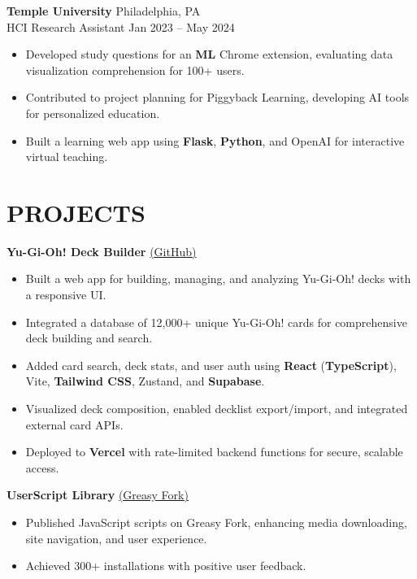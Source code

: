 \documentclass[10pt]{article}
\newcommand{\tightitems}{\vspace{-5pt}}
\begin{document}
\textbf{\normalsize Temple University} \hfill Philadelphia, PA \\
{HCI Research Assistant} \hfill Jan 2023 -- May 2024
\tightitems
\begin{itemize}[leftmargin=2em]
    \item Developed study questions for an \textbf{ML} Chrome extension, evaluating data visualization comprehension for 100+ users.
    \item Contributed to project planning for Piggyback Learning, developing AI tools for personalized education.
    \item Built a learning web app using \textbf{Flask}, \textbf{Python}, and OpenAI for interactive virtual teaching.
\end{itemize}



\section*{\textbf{\normalsize PROJECTS}}

\textbf{\normalsize Yu-Gi-Oh! Deck Builder} \href{https://github.com/icycoldveins/duel-master-builder}{(GitHub)}
\tightitems
\begin{itemize}[leftmargin=2em]
    \item Built a web app for building, managing, and analyzing Yu-Gi-Oh! decks with a responsive UI.
    \item Integrated a database of 12,000+ unique Yu-Gi-Oh! cards for comprehensive deck building and search.
    \item Added card search, deck stats, and user auth using \textbf{React} (\textbf{TypeScript}), Vite, \textbf{Tailwind CSS}, Zustand, and \textbf{Supabase}.
    \item Visualized deck composition, enabled decklist export/import, and integrated external card APIs.
    \item Deployed to \textbf{Vercel} with rate-limited backend functions for secure, scalable access.
\end{itemize}

\textbf{\normalsize UserScript Library} \href{https://greasyfork.org/en/users/988096-icycoldveins}{(Greasy Fork)}
\tightitems
\begin{itemize}[leftmargin=2em]
    \item Published JavaScript scripts on Greasy Fork, enhancing media downloading, site navigation, and user experience.
    \item Achieved 300+ installations with positive user feedback.
\end{itemize}
\end{document}
